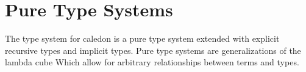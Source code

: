 \section{Pure Type Systems}
The type system for caledon is a pure type system \citep{mckinna1993pure} 
extended with explicit recursive types and implicit types.
Pure type systems are generalizations of the lambda cube
\citep{barendregt1991introduction} Which allow for arbitrary relationships between 
terms and types.